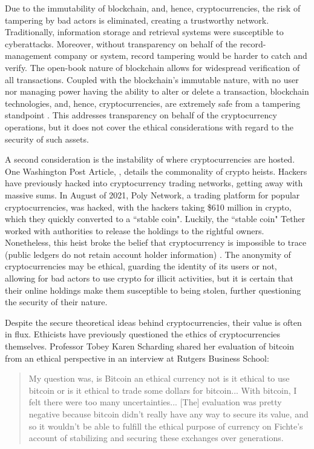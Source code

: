 \documentclass[10pt,twocolumn]{article}
\begin{document}
Due to the immutability of blockchain, and, hence, cryptocurrencies, the risk of tampering by bad actors is eliminated, creating a trustworthy network. Traditionally, information storage and retrieval systems were susceptible to cyberattacks. Moreover, without transparency on behalf of the record-management company or system, record tampering would be harder to catch and verify. The open-book nature of blockchain allows for widespread verification of all transactions. Coupled with the blockchain's immutable nature, with no user nor managing power having the ability to alter or delete a transaction, blockchain technologies, and, hence, cryptocurrencies, are extremely safe from a tampering standpoint \cite{WhatIsBlockchain}. This addresses transparency on behalf of the cryptocurrency operations, but it does not cover the ethical considerations with regard to the security of such assets.

A second consideration is the instability of where cryptocurrencies are hosted. One Washington Post Article, , details the commonality of crypto heists. Hackers have previously hacked into cryptocurrency trading networks, getting away with massive sums. In August of 2021, Poly Network, a trading platform for popular cryptocurrencies, was hacked, with the hackers taking 
\$610 million in crypto, which they quickly converted to a ``stable coin". Luckily, the ``stable coin" Tether worked with authorities to release the holdings to the rightful owners. Nonetheless, this heist broke the belief that cryptocurrency is impossible to trace (public ledgers do not retain account holder information) \cite{TrackingStolenCrypto}. The anonymity of cryptocurrencies may be ethical, guarding the identity of its users or not, allowing for bad actors to use crypto for illicit activities, but it is certain that their online holdings make them susceptible to being stolen, further questioning the security of their nature.

Despite the secure theoretical ideas behind cryptocurrencies, their value is often in flux. Ethicists have previously questioned the ethics of cryptocurrencies themselves. Professor Tobey Karen Scharding shared her evaluation of bitcoin from an ethical perspective in an interview at Rutgers Business School:

\begin{quote}
    My question was, is Bitcoin an ethical currency not is it ethical to use bitcoin or is it ethical to trade some dollars for bitcoin... With bitcoin, I felt there were too many uncertainties... [The] evaluation was pretty negative because bitcoin didn't really have any way to secure its value, and so it wouldn't be able to fulfill the ethical purpose of currency on Fichte's account of stabilizing and securing these exchanges over generations. \cite{IsBitcoinEthical}
\end{quote}
\end{document}
